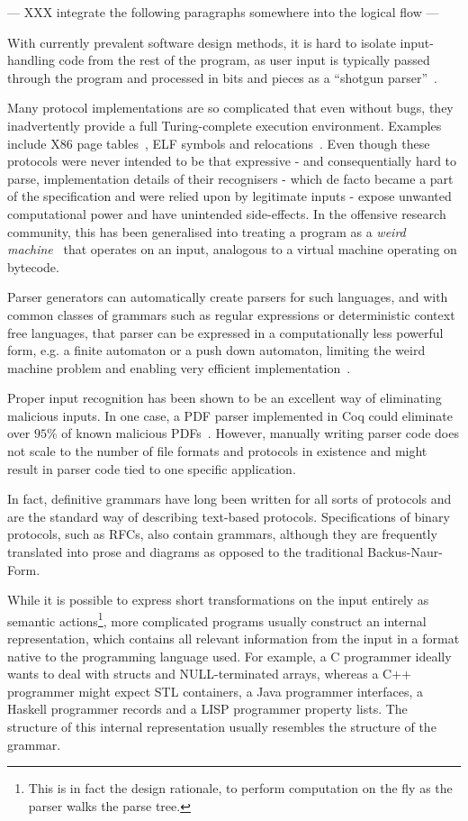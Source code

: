 --- XXX integrate the following paragraphs somewhere into the logical flow ---

With currently prevalent software design methods, it is hard to isolate
input-handling code from the rest of the program, as user input is
typically passed through the program and processed in bits and pieces as a
``shotgun parser''~\cite{shotgun-parser}.

Many protocol implementations are so complicated that even
without bugs, they inadvertently provide a full Turing-complete execution
environment. Examples include X86 page tables~\cite{bangert2013page},
ELF symbols and relocations~\cite{shapiro2013weird}. Even though
these protocols were never intended to be that expressive -
and consequentially hard to parse, implementation details of their
recognisers - which de facto became a part of the specification and were
relied upon by legitimate inputs - expose unwanted computational power
and have unintended side-effects.  In the offensive research community,
this has been generalised into treating a program as a \textit{weird
machine}~\cite{bratus2011exploit} that operates on an input, analogous
to a virtual machine operating on bytecode.

Parser generators can automatically create parsers for such languages,
and with common classes of grammars such as regular expressions or
deterministic context free languages, that parser can be expressed in a
computationally less powerful form, e.g. a finite automaton or a push
down automaton, limiting the weird machine problem and enabling very
efficient implementation~\cite{Knuth1965607}.

Proper input recognition has been shown to be an excellent way of
eliminating malicious inputs. In one case, a  PDF parser implemented in
Coq could eliminate over $95\%$ of known malicious PDFs~\cite{Bogk-PDF}.
However, manually writing parser code does not scale to the number of
file formats  and protocols in existence and might result in parser code
tied to one specific application.

In fact, definitive grammars have long been written for all sorts of
protocols and are the standard way of describing text-based protocols.
Specifications of binary protocols, such as RFCs, also contain grammars,
although they are frequently translated into prose and diagrams as
opposed to the traditional Backus-Naur-Form.

While it is possible to express short transformations on the input
entirely as semantic actions\footnote{This is in fact the design
rationale, to perform computation on the fly as the parser walks the
parse tree.}, more complicated programs usually construct an internal
representation, which contains all relevant information from the input
in a format native to the programming language used. For example, a C
programmer ideally wants to deal with structs and NULL-terminated arrays,
whereas a C++ programmer might expect STL containers, a Java programmer
interfaces, a Haskell programmer records and a LISP programmer property
lists.  The structure of this internal representation usually resembles
the structure of the grammar.


